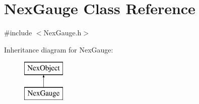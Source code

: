 \hypertarget{class_nex_gauge}{\section{Nex\+Gauge Class Reference}
\label{class_nex_gauge}
}


{\ttfamily \#include $<$Nex\+Gauge.\+h$>$}

Inheritance diagram for Nex\+Gauge\+:\begin{figure}[H]
\begin{center}
\leavevmode
\includegraphics[height=2.000000cm]{class_nex_gauge}
\end{center}
\end{figure}
